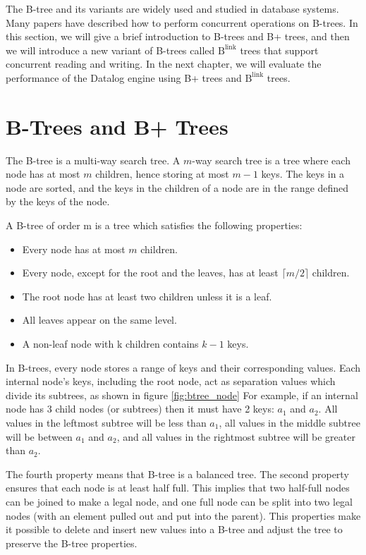 \documentclass[11pt]{report}
\theoremstyle{definition}
\begin{document}
The B-tree and its variants are widely used and studied in database systems. Many papers have described how to perform concurrent operations on B-trees. In this section, we will give a brief introduction to B-trees and B+ trees, and then we will introduce a new variant of B-trees called $\text{B}^{\text{link}}$ trees that support concurrent reading and writing. In the next chapter, we will evaluate the performance of the Datalog engine using B+ trees and $\text{B}^{\text{link}}$ trees.

\section{B-Trees and B+ Trees}
\label{sec:btrees}

The B-tree is a multi-way search tree. A $m$-way search tree is a tree where each node has at most $m$ children, hence storing at most $m-1$ keys. The keys in a node are sorted, and the keys in the children of a node are in the range defined by the keys of the node.

A B-tree of order m is a tree which satisfies the following properties:
\begin{itemize}
  \item Every node has at most $m$ children.
  \item Every node, except for the root and the leaves, has at least $\lceil m/2 \rceil$ children.
  \item The root node has at least two children unless it is a leaf.
  \item All leaves appear on the same level.
  \item A non-leaf node with k children contains $k-1$ keys.
\end{itemize}

In B-trees, every node stores a range of keys and their corresponding values. Each internal node's keys, including the root node, act as separation values which divide its subtrees, as shown in figure \ref{fig:btree_node} For example, if an internal node has 3 child nodes (or subtrees) then it must have 2 keys: $a_1$ and $a_2$. All values in the leftmost subtree will be less than $a_1$, all values in the middle subtree will be between $a_1$ and $a_2$, and all values in the rightmost subtree will be greater than $a_2$.

The fourth property means that B-tree is a balanced tree. The second property ensures that each node is at least half full. This implies that two half-full nodes can be joined to make a legal node, and one full node can be split into two legal nodes (with an element pulled out and put into the parent). This properties make it possible to delete and insert new values into a B-tree and adjust the tree to preserve the B-tree properties.
\end{document}
